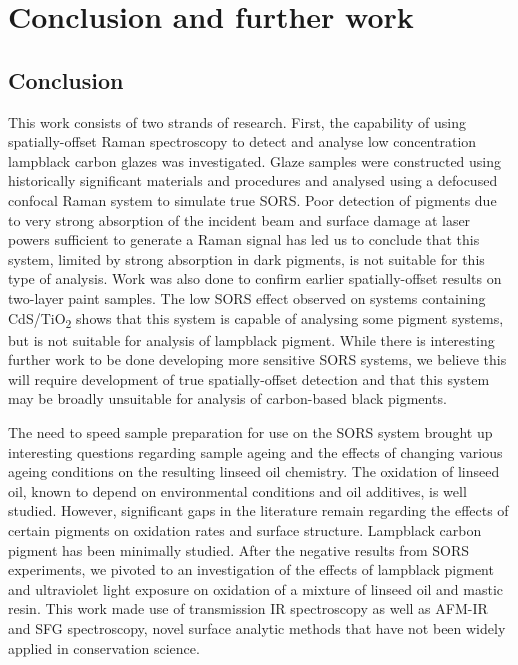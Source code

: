 \chapter{Conclusion and further work}

\ifpdf
    \graphicspath{{Chapter4/Figs/Raster/}{Chapter4/Figs/PDF/}{Chapter4/Figs/}}
\else
    \graphicspath{{Chapter4/Figs/Vector/}{Chapter4/Figs/}}
\fi


\section{Conclusion}
\label{section4.1}

This work consists of two strands of research. First, the capability of using spatially-offset Raman spectroscopy to detect and analyse low concentration lampblack carbon glazes was investigated. Glaze samples were constructed using historically significant materials and procedures and analysed using a defocused confocal Raman system to simulate true SORS. Poor detection of pigments due to very strong absorption of the incident beam and surface damage at laser powers sufficient to generate a Raman signal has led us to conclude that this system, limited by strong absorption in dark pigments, is not suitable for this type of analysis. Work was also done to confirm earlier spatially-offset results on two-layer paint samples. The low SORS effect observed on systems containing CdS/TiO\textsubscript{2} shows that this system is capable of analysing some pigment systems, but is not suitable for analysis of lampblack pigment. While there is interesting further work to be done developing more sensitive SORS systems, we believe this will require development of true spatially-offset detection and that this system may be broadly unsuitable for analysis of carbon-based black pigments.

The need to speed sample preparation for use on the SORS system brought up interesting questions regarding sample ageing and the effects of changing various ageing conditions on the resulting linseed oil chemistry. The oxidation of linseed oil, known to depend on environmental conditions and oil additives, is well studied. However, significant gaps in the literature remain regarding the effects of certain pigments on oxidation rates and surface structure. Lampblack carbon pigment has been minimally studied. After the negative results from SORS experiments, we pivoted to an investigation of the effects of lampblack pigment and ultraviolet light exposure on oxidation of a mixture of linseed oil and mastic resin. This work made use of transmission IR spectroscopy as well as AFM-IR and SFG spectroscopy, novel surface analytic methods that have not been widely applied in conservation science.

